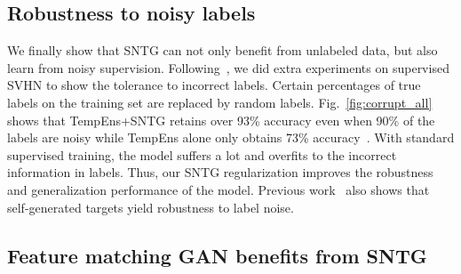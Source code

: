 \documentclass[10pt,twocolumn,letterpaper]{article}
\begin{document}
\subsection{Robustness to noisy labels}
\label{sec:noisy}

We finally show that SNTG can not only benefit from unlabeled data, but also learn from noisy supervision. Following~\cite{laine2016temporal}, we did extra experiments on supervised SVHN to show the tolerance to incorrect labels. Certain percentages of true labels on the training set are replaced by random labels. Fig.~\ref{fig:corrupt_all} shows that TempEns+SNTG retains over 93\% accuracy even when 90\% of the labels are noisy while TempEns alone only obtains 73\% accuracy~\cite{laine2016temporal}. With standard supervised training, the model suffers a lot and overfits to the incorrect information in labels. Thus, our SNTG regularization improves the robustness and generalization performance of the model. Previous work~\cite{reed2014training} also shows that self-generated targets yield robustness to label noise.

\subsection{Feature matching GAN benefits from SNTG}
\end{document}
